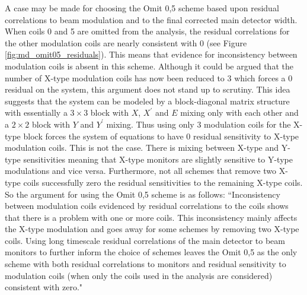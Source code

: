 A case may be made for choosing the Omit 0,5 scheme based upon residual correlations to beam modulation and to the final corrected main detector width. When coils 0 and 5 are omitted from the analysis, the residual correlations for the other modulation coils are nearly consistent with 0 (see Figure \ref{fig:md_omit05_residuals}). This means that evidence for inconsistency between modulation coils is absent in this scheme. Although it could be argued that the number of X-type modulation coils has now been reduced to 3 which forces a 0 residual on the system, this argument does not stand up to scrutiny. This idea suggests that the system can be modeled by a block-diagonal matrix structure with essentially a $3\times3$ block with $X$, $X^{\prime}$ and $E$ mixing only with each other and a $2\times2$ block with $Y$ and $Y^{\prime}$ mixing. Thus using only 3 modulation coils for the X-type block forces the system of equations to have 0 residual sensitivity to X-type modulation coils. This is not the case. There is mixing between X-type and Y-type sensitivities meaning that X-type monitors are slightly sensitive to Y-type modulations and vice versa. Furthermore, not all schemes that remove two X-type coils successfully zero the residual sensitivities to the remaining X-type coils. So the argument for using the Omit 0,5 scheme is as follows: ``Inconsistency between modulation coils evidenced by residual correlations to the coils shows that there is a problem with one or more coils. This inconsistency mainly affects the X-type modulation and goes away for some schemes by removing two X-type coils. Using long timescale residual correlations of the main detector to beam monitors to further inform the choice of schemes leaves the Omit 0,5 as the only scheme with both residual correlations to monitors and residual sensitivity to modulation coils (when only the coils used in the analysis are considered) consistent with zero." 

